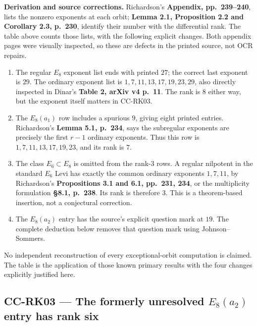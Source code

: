 \documentclass[11pt,a4paper]{article}
\theoremstyle{definition}\newtheorem{definition}[theorem]{Definition}
\theoremstyle{remark}\newtheorem{remark}[theorem]{Remark}
\begin{document}
\textbf{Derivation and source corrections.} Richardson's \textbf{Appendix, pp.~239--240}, lists the nonzero exponents at each orbit; \textbf{Lemma 2.1, Proposition 2.2 and Corollary 2.3, p.~230}, identify their number with the differential rank. The table above counts those lists, with the following explicit changes. Both appendix pages were visually inspected, so these are defects in the printed source, not OCR repairs.

\begin{enumerate}
\def\labelenumi{\arabic{enumi}.}
\item
  The regular \(E_8\) exponent list ends with printed \(27\); the correct last exponent is \(29\). The ordinary exponent list is \(1,7,11,13,17,19,23,29\), also directly inspected in Dinar's \textbf{Table 2, arXiv v4 p.~11}. The rank is \(8\) either way, but the exponent itself matters in CC-RK03.
\item
  The \(E_8(a_1)\) row includes a spurious \(9\), giving eight printed entries. Richardson's \textbf{Lemma 5.1, p.~234}, says the subregular exponents are precisely the first \(r-1\) ordinary exponents. Thus this row is \(1,7,11,13,17,19,23\), and its rank is \(7\).
\item
  The class \(E_6\subset E_8\) is omitted from the rank-\(3\) rows. A regular nilpotent in the standard \(E_6\) Levi has exactly the common ordinary exponents \(1,7,11\), by Richardson's \textbf{Propositions 3.1 and 6.1, pp.~231, 234}, or the multiplicity formulation \textbf{§8.1, p.~238}. Its rank is therefore \(3\). This is a theorem-based insertion, not a conjectural correction.
\item
  The \(E_8(a_2)\) entry has the source's explicit question mark at \(19\). The complete deduction below removes that question mark using Johnson--Sommers.
\end{enumerate}

No independent reconstruction of every exceptional-orbit computation is claimed. The table is the application of those known primary results with the four changes explicitly justified here.

\subsection{\texorpdfstring{CC-RK03 --- The formerly unresolved \(E_8(a_2)\) entry has rank six}{CC-RK03 --- The formerly unresolved E\_8(a\_2) entry has rank six}}\label{cc-rk03-the-formerly-unresolved-e_8a_2-entry-has-rank-six}
\end{document}
